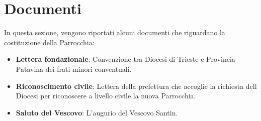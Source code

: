 \chapter{Documenti}
\label{chap:Documenti}
In questa sezione, vengono riportati alcuni documenti che riguardano la costituzione della Parrocchia:

\begin{itemize}
\item \textbf{Lettera fondazionale}: Convenzione tra Diocesi di Trieste e Provincia Patavina dei frati minori conventuali.
\item \textbf{Riconoscimento civile}: Lettera della prefettura che accoglie la richiesta dell Diocesi per riconoscere a livello civile la nuova Parrocchia.
\item \textbf{Saluto del Vescovo}: L'augurio del Vescovo Santin.
\end{itemize}

